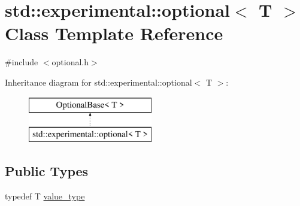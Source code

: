 \hypertarget{classstd_1_1experimental_1_1optional}{}\section{std\+:\+:experimental\+:\+:optional$<$ T $>$ Class Template Reference}
\label{classstd_1_1experimental_1_1optional}


{\ttfamily \#include $<$optional.\+h$>$}

Inheritance diagram for std\+:\+:experimental\+:\+:optional$<$ T $>$\+:\begin{figure}[H]
\begin{center}
\leavevmode
\includegraphics[height=2.000000cm]{classstd_1_1experimental_1_1optional}
\end{center}
\end{figure}
\subsection*{Public Types}
\begin{DoxyCompactItemize}
\item 
typedef T \mbox{\hyperlink{classstd_1_1experimental_1_1optional_a3b480b4a74492ffdbcc9d8529ed512fc}{value\+\_\+type}}
\end{DoxyCompactItemize}
